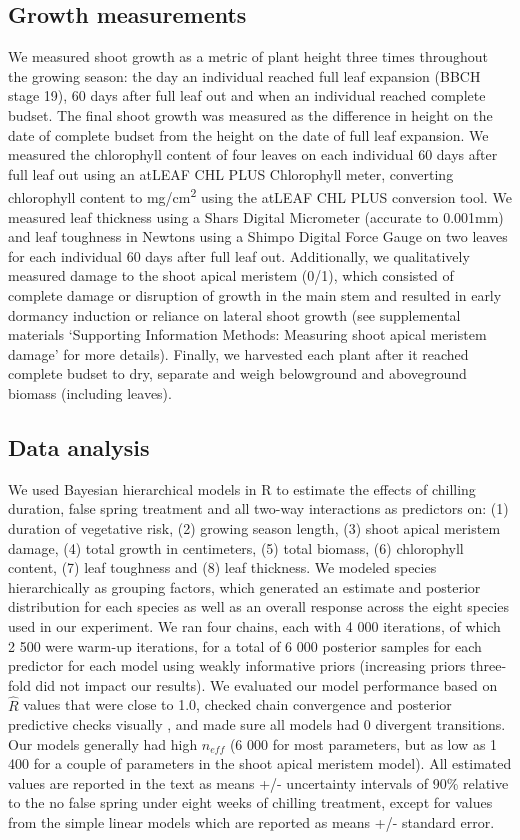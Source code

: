 \documentclass{article}\usepackage[]{graphicx}\usepackage[]{color}
\begin{document}
\subsection*{Growth measurements}
We measured shoot growth as a metric of plant height three times throughout the growing season: the day an individual reached full leaf expansion (BBCH stage 19), 60 days after full leaf out and when an individual reached complete budset. The final shoot growth was measured as the difference in height on the date of complete budset from the height on the date of full leaf expansion. We measured the chlorophyll content of four leaves on each individual 60 days after full leaf out using an atLEAF CHL PLUS Chlorophyll meter, converting chlorophyll content to mg/cm\textsuperscript{2} using the atLEAF CHL PLUS conversion tool. We measured leaf thickness using a Shars Digital Micrometer (accurate to 0.001mm) and leaf toughness in Newtons using a Shimpo Digital Force Gauge on two leaves for each individual 60 days after full leaf out. Additionally, we qualitatively measured damage to the shoot apical meristem (0/1), which consisted of complete damage or disruption of growth in the main stem and resulted in early dormancy induction or reliance on lateral shoot growth (see supplemental materials `Supporting Information Methods: Measuring shoot apical meristem damage' for more details). Finally, we harvested each plant after it reached complete budset to dry, separate and weigh belowground and aboveground biomass (including leaves). 

\subsection*{Data analysis} 
We used Bayesian hierarchical models \citep[with the brms package,][version 2.3.1]{brms} in R \citep[][version 3.3.1]{R} to estimate the effects of chilling duration, false spring treatment and all two-way interactions as predictors on: (1) duration of vegetative risk, (2) growing season length, (3) shoot apical meristem damage, (4) total growth in centimeters, (5) total biomass, (6) chlorophyll content, (7) leaf toughness and (8) leaf thickness. We modeled species hierarchically as grouping factors, which generated an estimate and posterior distribution for each species as well as an overall response across the eight species used in our experiment. We ran four chains, each with 4 000 iterations, of which 2 500 were warm-up iterations, for a total of 6 000 posterior samples for each predictor for each model using weakly informative priors (increasing priors three-fold did not impact our results). We evaluated our model performance based on $\hat{R}$ values that were close to 1.0, checked chain convergence and posterior predictive checks visually \citep{BDA}, and made sure all models had 0 divergent transitions. Our models generally had high $n_{eff}$ (6 000 for most parameters, but as low as 1 400 for a couple of parameters in the shoot apical meristem model). All estimated values are reported in the text as means +/- uncertainty intervals of 90\% relative to the no false spring under eight weeks of chilling treatment, except for values from the simple linear models which are reported as means +/- standard error. 
\end{document}
